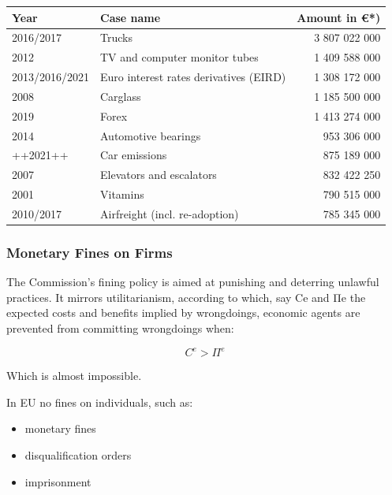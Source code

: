             \begin{tabular}{|l|l|r|}
            \hline
            Year & Case name & Amount in €*) \\
            \hline
            2016/2017 & Trucks & 3 807 022 000 \\
            2012 & TV and computer monitor tubes & 1 409 588 000 \\
            2013/2016/2021 & Euro interest rates derivatives (EIRD) & 1 308 172 000 \\
            2008 & Carglass & 1 185 500 000 \\
            2019 & Forex & 1 413 274 000 \\
            2014 & Automotive bearings & 953 306 000 \\
            ++2021++ & Car emissions & 875 189 000 \\
            2007 & Elevators and escalators & 832 422 250 \\
            2001 & Vitamins & 790 515 000 \\
            2010/2017 & Airfreight (incl. re-adoption) & 785 345 000 \\
            \hline
            \end{tabular}

        \subsubsection{Monetary Fines on Firms}

            The Commission's fining policy is aimed at punishing and deterring unlawful practices. It mirrors utilitarianism, according to which, say Ce and Πe the expected costs and benefits implied by wrongdoings, economic agents are prevented from committing wrongdoings when:
            
            \begin{equation}
                C^e > \Pi^e
            \end{equation}
            
            Which is almost impossible.
            

            In EU no fines on individuals, such as:
            \begin{itemize}
                \item  monetary fines
                \item disqualification orders
                \item imprisonment
            \end{itemize}

